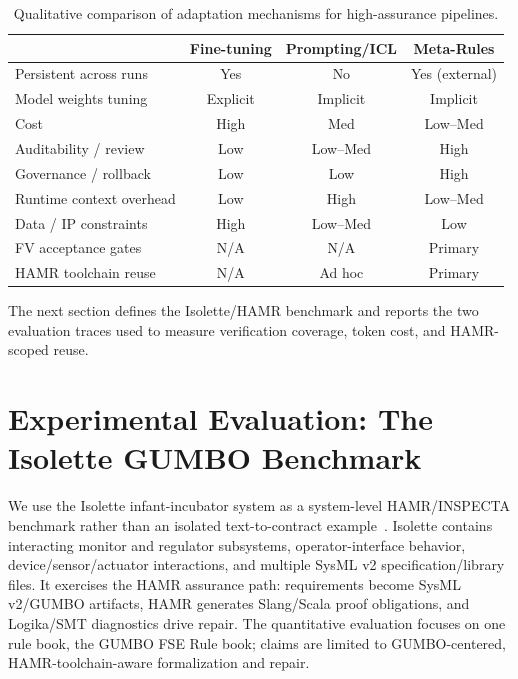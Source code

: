 \documentclass[conference]{IEEEtran}
\begin{document}
\begin{table}[!t]
\caption{Qualitative comparison of adaptation mechanisms for high-assurance pipelines.}
\centering
\label{tab:adaptation-compare}
\scriptsize
\begin{tabular}{p{}ccc}
\hline
 & Fine-tuning & Prompting/ICL & Meta-Rules\\
\hline
Persistent across runs & Yes & No & Yes (external) \\
Model weights tuning& Explicit & Implicit & Implicit \\
Cost & High & Med & Low--Med \\
Auditability / review & Low & Low--Med & High \\
Governance / rollback & Low & Low & High \\
Runtime context overhead & Low & High & Low--Med \\
Data / IP constraints & High & Low--Med & Low \\
FV acceptance gates & N/A & N/A & Primary \\
HAMR toolchain reuse & N/A & Ad hoc & Primary \\
\hline
\end{tabular}
\end{table}

The next section defines the Isolette/HAMR benchmark and reports the two evaluation traces used to measure verification coverage, token cost, and HAMR-scoped reuse.


\section{Experimental Evaluation: The Isolette GUMBO Benchmark}
\label{sec:example}

We use the Isolette infant-incubator system as a system-level HAMR/INSPECTA benchmark rather than an isolated text-to-contract example~\cite{hatcliff2024isolette}. Isolette contains interacting monitor and regulator subsystems, operator-interface behavior, device/sensor/actuator interactions, and multiple SysML v2 specification/library files. It exercises the HAMR assurance path: requirements become SysML v2/GUMBO artifacts, HAMR generates Slang/Scala proof obligations, and Logika/SMT diagnostics drive repair. The quantitative evaluation focuses on one rule book, the GUMBO FSE Rule book; claims are limited to GUMBO-centered, HAMR-toolchain-aware formalization and repair.
\end{document}
